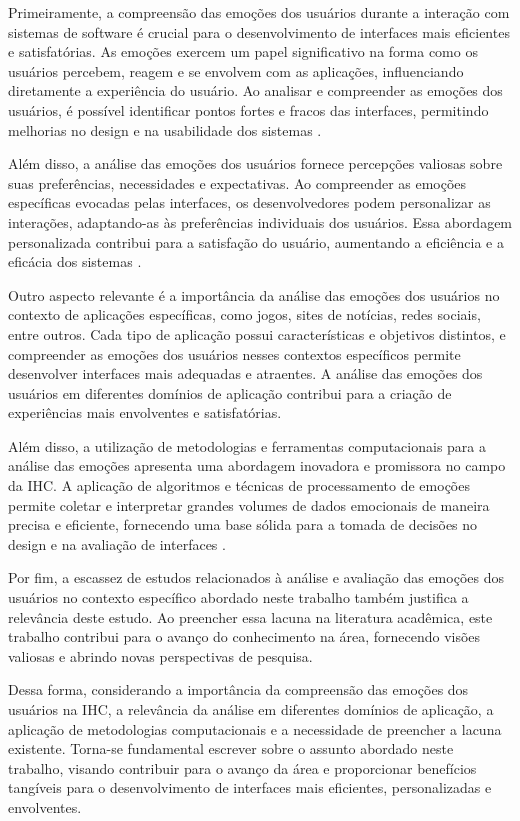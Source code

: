 Primeiramente, a compreensão das emoções dos usuários durante a interação com sistemas de software é crucial para o desenvolvimento de interfaces mais eficientes e satisfatórias. As emoções exercem um papel significativo na forma como os usuários percebem, reagem e se envolvem com as aplicações, influenciando diretamente a experiência do usuário. Ao analisar e compreender as emoções dos usuários, é possível identificar pontos fortes e fracos das interfaces, permitindo melhorias no design e na usabilidade dos sistemas \cite{6}.

Além disso, a análise das emoções dos usuários fornece percepções valiosas sobre suas preferências, necessidades e expectativas. Ao compreender as emoções específicas evocadas pelas interfaces, os desenvolvedores podem personalizar as interações, adaptando-as às preferências individuais dos usuários. Essa abordagem personalizada contribui para a satisfação do usuário, aumentando a eficiência e a eficácia dos sistemas \cite{7}.

Outro aspecto relevante é a importância da análise das emoções dos usuários no contexto de aplicações específicas, como jogos, sites de notícias, redes sociais, entre outros. Cada tipo de aplicação possui características e objetivos distintos, e compreender as emoções dos usuários nesses contextos específicos permite desenvolver interfaces mais adequadas e atraentes. A análise das emoções dos usuários em diferentes domínios de aplicação contribui para a criação de experiências mais envolventes e satisfatórias.

Além disso, a utilização de metodologias e ferramentas computacionais para a análise das emoções apresenta uma abordagem inovadora e promissora no campo da IHC. A aplicação de algoritmos e técnicas de processamento de emoções permite coletar e interpretar grandes volumes de dados emocionais de maneira precisa e eficiente, fornecendo uma base sólida para a tomada de decisões no design e na avaliação de interfaces \cite{8}.

Por fim, a escassez de estudos relacionados à análise e avaliação das emoções dos usuários no contexto específico abordado neste trabalho também justifica a relevância deste estudo. Ao preencher essa lacuna na literatura acadêmica, este trabalho contribui para o avanço do conhecimento na área, fornecendo visões valiosas e abrindo novas perspectivas de pesquisa.

Dessa forma, considerando a importância da compreensão das emoções dos usuários na IHC, a relevância da análise em diferentes domínios de aplicação, a aplicação de metodologias computacionais e a necessidade de preencher a lacuna existente. Torna-se fundamental escrever sobre o assunto abordado neste trabalho, visando contribuir para o avanço da área e proporcionar benefícios tangíveis para o desenvolvimento de interfaces mais eficientes, personalizadas e envolventes.

